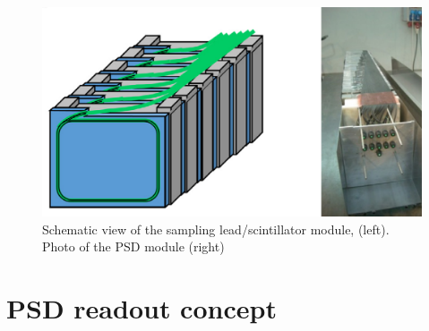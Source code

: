 \documentclass[a4paper,11pt]{article}
\begin{document}
\begin{figure}[htbp]
\centering 
\includegraphics[width=.45\textwidth]{PSD_module.png}
\caption{\label{fig:2} Schematic view of the sampling lead/scintillator module, (left). Photo of the PSD module (right)}
\end{figure}



\section{PSD readout concept}
\end{document}
